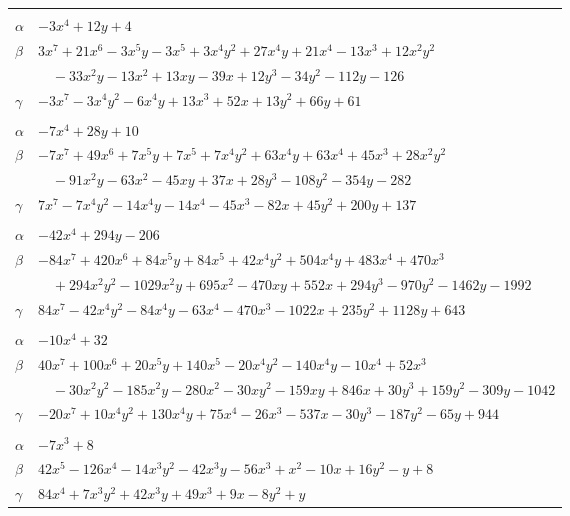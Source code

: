 \documentclass[11pt]{article}
\begin{document}
\begin{longtable}{@{}ll@{}}
\addlinespace[3pt]
\multicolumn{2}{@{}l}{$\{i,j\}=\{21,95\}$, $k_{ij}=2^{3}$}\\
$\alpha$ & $-3x^{4}+12y+4$\\
$\beta$ & $3x^{7}+21x^{6}-3x^{5}y-3x^{5}+3x^{4}y^{2}+27x^{4}y+21x^{4}-13x^{3}+12x^{2}y^{2}$\\
 & $\quad -33x^{2}y-13x^{2}+13xy-39x+12y^{3}-34y^{2}-112y-126$\\
$\gamma$ & $-3x^{7}-3x^{4}y^{2}-6x^{4}y+13x^{3}+52x+13y^{2}+66y+61$\\
\addlinespace[3pt]
\multicolumn{2}{@{}l}{$\{i,j\}=\{21,97\}$, $k_{ij}=2\cdot 3^{2}$}\\
$\alpha$ & $-7x^{4}+28y+10$\\
$\beta$ & $-7x^{7}+49x^{6}+7x^{5}y+7x^{5}+7x^{4}y^{2}+63x^{4}y+63x^{4}+45x^{3}+28x^{2}y^{2}$\\
 & $\quad -91x^{2}y-63x^{2}-45xy+37x+28y^{3}-108y^{2}-354y-282$\\
$\gamma$ & $7x^{7}-7x^{4}y^{2}-14x^{4}y-14x^{4}-45x^{3}-82x+45y^{2}+200y+137$\\
\addlinespace[3pt]
\multicolumn{2}{@{}l}{$\{i,j\}=\{21,107\}$, $k_{ij}=2^{2}\cdot 5^{3}$}\\
$\alpha$ & $-42x^{4}+294y-206$\\
$\beta$ & $-84x^{7}+420x^{6}+84x^{5}y+84x^{5}+42x^{4}y^{2}+504x^{4}y+483x^{4}+470x^{3}$\\
 & $\quad +294x^{2}y^{2}-1029x^{2}y+695x^{2}-470xy+552x+294y^{3}-970y^{2}-1462y-1992$\\
$\gamma$ & $84x^{7}-42x^{4}y^{2}-84x^{4}y-63x^{4}-470x^{3}-1022x+235y^{2}+1128y+643$\\
\addlinespace[3pt]
\multicolumn{2}{@{}l}{$\{i,j\}=\{22,40\}$, $k_{ij}=2^{7}\cdot 3\cdot 5$}\\
$\alpha$ & $-10x^{4}+32$\\
$\beta$ & $40x^{7}+100x^{6}+20x^{5}y+140x^{5}-20x^{4}y^{2}-140x^{4}y-10x^{4}+52x^{3}$\\
 & $\quad -30x^{2}y^{2}-185x^{2}y-280x^{2}-30xy^{2}-159xy+846x+30y^{3}+159y^{2}-309y-1042$\\
$\gamma$ & $-20x^{7}+10x^{4}y^{2}+130x^{4}y+75x^{4}-26x^{3}-537x-30y^{3}-187y^{2}-65y+944$\\
\addlinespace[3pt]
\multicolumn{2}{@{}l}{$\{i,j\}=\{22,43\}$, $k_{ij}=2^{3}$}\\
$\alpha$ & $-7x^{3}+8$\\
$\beta$ & $42x^{5}-126x^{4}-14x^{3}y^{2}-42x^{3}y-56x^{3}+x^{2}-10x+16y^{2}-y+8$\\
$\gamma$ & $84x^{4}+7x^{3}y^{2}+42x^{3}y+49x^{3}+9x-8y^{2}+y$\\

\end{longtable}
\end{document}
